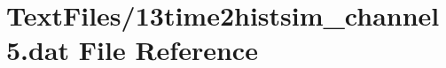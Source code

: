 \hypertarget{13time2histsim__channel5_8dat}{}\section{Text\+Files/13time2histsim\+\_\+channel5.dat File Reference}
\label{13time2histsim__channel5_8dat}
